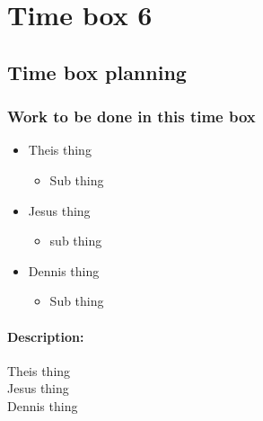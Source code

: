 \section{Time box 6}
\listoftodos
\subsection{Time box planning}

\begin{figure}[H]
	\begin{centering}
	\end{centering}
\end{figure}

\subsubsection{Work to be done in this time box}
\begin{itemize}
	\item Theis thing
	\begin{itemize}
		\item Sub thing
	\end{itemize}
	\item Jesus thing
		\begin{itemize}
			\item sub thing
		\end{itemize}
	\item Dennis thing
	\begin{itemize}
		\item Sub thing
	\end{itemize}
\end{itemize}

\paragraph{Description:}
\begin{description}
	\item[Theis thing]
	\item[Jesus thing]
	\item[Dennis thing]
\end{description}

